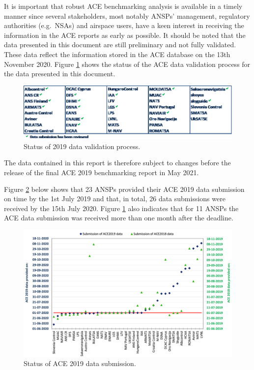 \documentclass[
]{book}
\begin{document}
It is important that robust ACE benchmarking analysis is available in a timely manner since several stakeholders, most notably ANSPs' management, regulatory authorities (e.g.~NSAs) and airspace users, have a keen interest in receiving the information in the ACE reports as early as possible.
It should be noted that the data presented in this document are still preliminary and not fully validated. These data reflect the information stored in the ACE database on the 13th November 2020. Figure \ref{fig:figure2} shows the status of the ACE data validation process for the data presented in this document.



\begin{figure}

{\centering \includegraphics[width=1\linewidth]{figures/Figure 1-2} 

}

\caption{Status of 2019 data validation process.}\label{fig:figure2}
\end{figure}

The data contained in this report is therefore subject to changes before the release of the final ACE 2019 benchmarking report in May 2021.

Figure \ref{fig:figure3} below shows that 23 ANSPs provided their ACE 2019 data submission on time by the 1st July 2019 and that, in total, 26 data submissions were received by the 15th July 2020. Figure \ref{fig:figure2} also indicates that for 11 ANSPs the ACE data submission was received more than one month after the deadline.



\begin{figure}

{\centering \includegraphics[width=1\linewidth]{figures/Figure 1-3} 

}

\caption{Status of ACE 2019 data submission.}\label{fig:figure3}
\end{figure}
\end{document}
